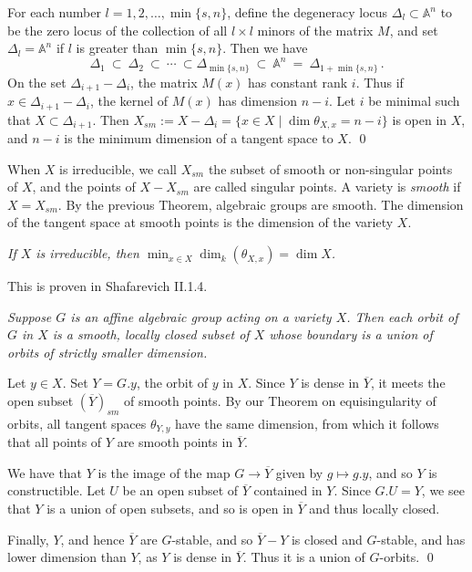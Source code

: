 \documentclass[12pt]{amsart}
\begin{document}
For each number $l=1,2,\ldots,\min\{s,n\}$, define the degeneracy locus 
$\Delta_l\subset{\mathbb A}^n$ to be the zero locus of the collection of all
$l\times l$ minors of the matrix $M$, and set $\Delta_l={\mathbb A}^n$ if 
$l$ is greater than $\min\{s,n\}$.
Then we have
$$
  \Delta_1\ \subset\ \Delta_2\ \subset\ \cdots\ \subset 
  \Delta_{\min\{s,n\}}\ \subset\ {\mathbb A}^n\ 
   =\ \Delta_{1+\min\{s,n\}}\,.
$$
On the set $\Delta_{i+1}-\Delta_i$, the matrix $M(x)$ has constant rank $i$.
Thus if $x\in \Delta_{i+1}-\Delta_i$, the kernel of $M(x)$ has dimension
$n-i$. 
Let $i$ be minimal such that $X\subset \Delta_{i+1}$.
Then $X_{sm}:=X-\Delta_i=\{x\in X\mid \dim\theta_{X,x}=n-i\}$ is open in
$X$, and  $n-i$ is the minimum dimension of a tangent space to $X$.
\qed

When $X$ is irreducible, we call $X_{sm}$ the subset of smooth or
non-singular points of $X$, and the points of $X-X_{sm}$ are called singular
points. 
A variety is {\sl smooth} if $X=X_{sm}$.
By the previous Theorem, algebraic groups are smooth.
The dimension of the tangent space at smooth points is the dimension of the
variety $X$.\medskip

{\it 
If $X$ is irreducible, then 
$\min_{x\in X}\dim_k(\theta_{X,x})=\dim X$.
}\medskip

This is proven in Shafarevich II.1.4.
\medskip

{\it
Suppose $G$ is an affine algebraic group acting on a variety $X$.
Then each orbit of $G$ in $X$ is a smooth, locally closed subset of $X$
whose boundary is a union of orbits of strictly smaller dimension.}\medskip 

Let $y\in X$.
Set $Y=G.y$, the orbit of $y$ in $X$.
Since $Y$ is dense in $\overline{Y}$, it meets the open subset 
$(\overline{Y})_{sm}$ of smooth points.
By our Theorem on equisingularity of orbits, all tangent spaces
$\theta_{Y,y}$ have the same dimension, from which it follows
that all points of $Y$ are smooth points in $\overline{Y}$.

We have that $Y$ is the image of the map $G\to \overline{Y}$ given by 
$g\mapsto g.y$, and so $Y$ is constructible.
Let $U$ be an open subset of $\overline{Y}$ contained in $Y$.
Since $G.U=Y$, we see that $Y$ is a union of open subsets, and so is open in
$\overline{Y}$ and thus locally closed.

Finally, $Y$, and hence $\overline{Y}$ are $G$-stable, and so 
$\overline{Y}-Y$ is closed and $G$-stable, and has lower dimension than $Y$,
as $Y$ is dense in $\overline{Y}$.
Thus it is a union of $G$-orbits.
\qed
\end{document}
